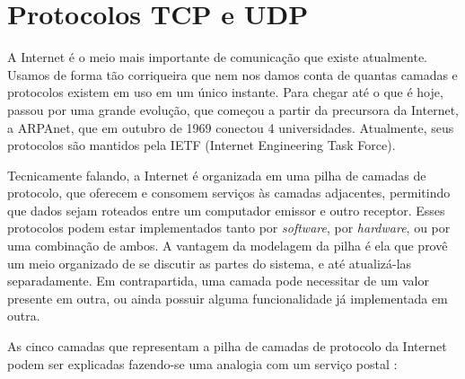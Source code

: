 
\section{Protocolos TCP e UDP}

A Internet é o meio mais importante de comunicação que existe atualmente. Usamos de
forma tão corriqueira que nem nos damos conta de quantas camadas e protocolos existem em
uso em um único instante. Para chegar até o que é hoje, passou por uma grande evolução,
que começou a partir da precursora da Internet, a ARPAnet, que em outubro de 1969
\cite{book:kurose} conectou 4 universidades. Atualmente, seus protocolos são mantidos
pela IETF (Internet Engineering Task Force).

Tecnicamente falando, a Internet é organizada em uma pilha de camadas de protocolo, que
oferecem e consomem serviços às camadas adjacentes, permitindo que dados sejam roteados
entre um computador emissor e outro receptor. Esses protocolos podem estar implementados
tanto por \emph{software}, por \emph{hardware}, ou por uma combinação de ambos. A
vantagem da modelagem da pilha é ela que provê um meio organizado de se discutir as
partes do sistema, e até atualizá-las separadamente. Em contrapartida, uma camada pode
necessitar de um valor presente em outra, ou ainda possuir alguma funcionalidade já
implementada em outra.

As cinco camadas que representam a pilha de camadas de protocolo da Internet podem ser
explicadas fazendo-se uma analogia com um serviço postal \cite{site:internet-layer}:


